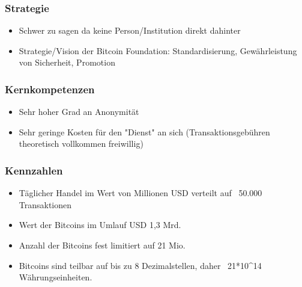 \subsubsection{Strategie}
\begin{itemize}
	\item Schwer zu sagen da keine Person/Institution direkt dahinter
	\item Strategie/Vision der Bitcoin Foundation: Standardisierung, Gewährleistung von Sicherheit, Promotion
\end{itemize}

\subsubsection{Kernkompetenzen}
\begin{itemize}
	\item Sehr hoher Grad an Anonymität
	\item Sehr geringe Kosten für den "Dienst" an sich (Transaktionsgebühren theoretisch vollkommen freiwillig)
\end{itemize}

\subsubsection{Kennzahlen}
\begin{itemize}
	\item Täglicher Handel im Wert von Millionen USD verteilt auf ~50.000 Transaktionen
	\item Wert der Bitcoins im Umlauf USD 1,3 Mrd.
	\item Anzahl der Bitcoins fest limitiert auf 21 Mio.
	\item Bitcoins sind teilbar auf bis zu 8 Dezimalstellen, daher ~21*10\textasciicircum 14 Währungseinheiten.
\end{itemize}
